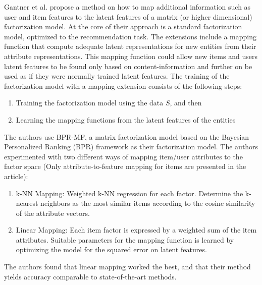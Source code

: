 
Gantner et al. \cite{Gantner2010} propose a method on how to map additional
information such as user and item features to the latent features of a matrix
(or higher dimensional) factorization model. At the core of their approach is a
standard factorization model, optimized to the recommendation task. The
extensions include a mapping function that compute adequate latent
representations for new entities from their attribute representations. This
mapping function could allow new items and users latent features to be found
only based on content-information and further on be used as if they were
normally trained latent features. The training of the factorization model with
a mapping extension consists of the following steps:

\begin{enumerate}
\item Training the factorization model using the data $S$, and then
\item Learning the mapping functions from the latent features of the entities
\end{enumerate}

The authors use BPR-MF, a matrix factorization model based on the Bayesian
Personalized Ranking (BPR) framework as their factorization model. The authors
experimented with two different ways of mapping item/user attributes to the
factor space (Only attribute-to-feature mapping for items are presented in the
article):

\begin{enumerate}
\item k-NN Mapping: Weighted k-NN regression for each factor. Determine the
k-nearest neighbors as the most similar items according to the cosine
similarity of the attribute vectors.
\item Linear Mapping: Each item factor is expressed by a weighted sum of the
item attributes. Suitable parameters for the mapping function is learned by
optimizing the model for the squared error on latent features.
\end{enumerate}

The authors found that linear mapping worked the best, and that their method
yields accuracy comparable to state-of-the-art methods.

